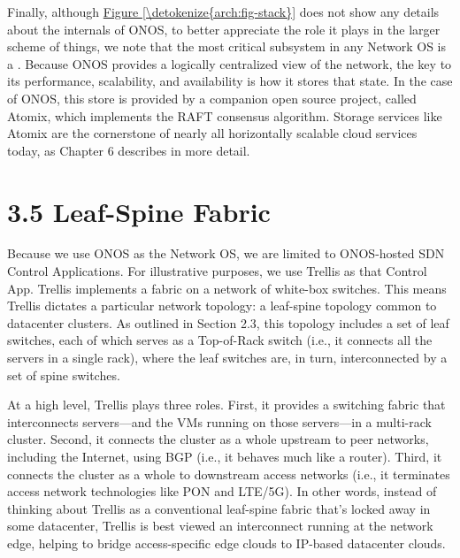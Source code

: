 \documentclass[letterpaper,11pt,english]{sphinxmanual}
\begin{document}
Finally, although \hyperref[\detokenize{arch:fig-stack}]{Figure \ref{\detokenize{arch:fig-stack}}} does not show any
details about the internals of ONOS, to better appreciate the role it
plays in the larger scheme of things, we note that the most critical
subsystem in any Network OS is a . Because
ONOS provides a logically centralized view of the network, the key to
its performance, scalability, and availability is how it stores that
state. In the case of ONOS, this store is provided by a companion open
source project, called Atomix, which implements the RAFT consensus
algorithm. Storage services like Atomix are the cornerstone of nearly
all horizontally scalable cloud services today, as Chapter 6 describes
in more detail.


\section{3.5 Leaf-Spine Fabric}
\label{\detokenize{arch:leaf-spine-fabric}}
Because we use ONOS as the Network OS, we are limited to ONOS-hosted
SDN Control Applications. For illustrative purposes, we use Trellis as
that Control App. Trellis implements a  fabric on a
network of white-box switches. This means Trellis dictates a
particular network topology: a leaf-spine topology common to
datacenter clusters. As outlined in Section 2.3, this topology
includes a set of leaf switches, each of which serves as a Top-of-Rack
switch (i.e., it connects all the servers in a single rack), where the
leaf switches are, in turn, interconnected by a set of spine switches.

At a high level, Trellis plays three roles. First, it provides a
switching fabric that interconnects servers—and the VMs running on
those servers—in a multi-rack cluster. Second, it connects the cluster
as a whole upstream to peer networks, including the Internet, using
BGP (i.e., it behaves much like a router). Third, it connects the
cluster as a whole to downstream access networks (i.e., it terminates
access network technologies like PON and LTE/5G). In other words,
instead of thinking about Trellis as a conventional leaf-spine fabric
that’s locked away in some datacenter, Trellis is best viewed an
interconnect running at the network edge, helping to bridge
access-specific edge clouds to IP-based datacenter clouds.
\end{document}
